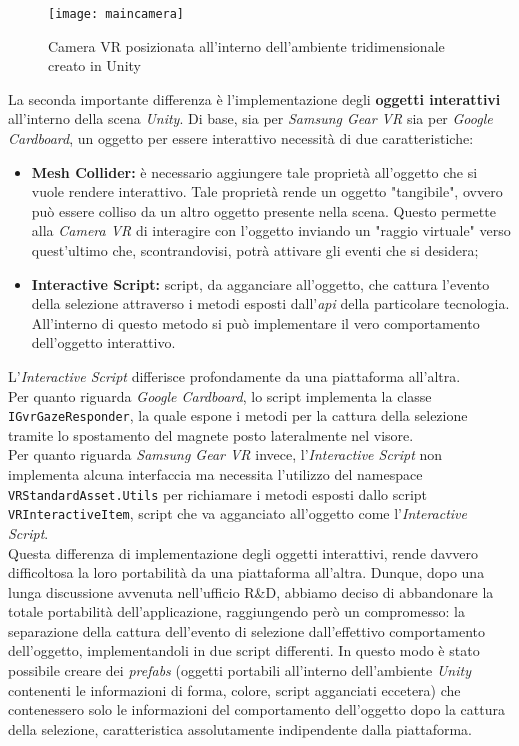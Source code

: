 \label{MainCamera}
\begin{figure}[ht]
	\begin{center}
		\texttt{[image: maincamera]}
		\caption{Camera VR posizionata all'interno dell'ambiente tridimensionale creato in Unity}
	\end{center}
\end{figure}
\FloatBarrier

La seconda importante differenza è l'implementazione degli \textbf{oggetti interattivi} all'interno della scena \textit{Unity}. Di base, sia per \textit{Samsung Gear VR} sia per \textit{Google Cardboard}, un oggetto per essere interattivo necessità di due caratteristiche:

\begin{itemize}
	\item \textbf{Mesh Collider:} è necessario aggiungere tale proprietà all'oggetto che si vuole rendere interattivo. Tale proprietà rende un oggetto "tangibile", ovvero può essere colliso da un altro oggetto presente nella scena. Questo permette alla \textit{Camera VR} di interagire con l'oggetto inviando un "raggio virtuale" verso quest'ultimo che, scontrandovisi, potrà attivare gli eventi che si desidera;
	\item \textbf{Interactive Script:} script, da agganciare all'oggetto, che cattura l'evento della selezione attraverso i metodi esposti dall'\textit{api} della particolare tecnologia. All'interno di questo metodo si può implementare il vero comportamento dell'oggetto interattivo.  
\end{itemize}

L'\textit{Interactive Script} differisce profondamente da una piattaforma all'altra. \\
Per quanto riguarda \textit{Google Cardboard}, lo script implementa la classe \texttt{IGvrGazeResponder}, la quale espone i metodi per la cattura della selezione tramite lo spostamento del magnete posto lateralmente nel visore. \\
Per quanto riguarda \textit{Samsung Gear VR} invece, l'\textit{Interactive Script} non implementa alcuna interfaccia ma necessita l'utilizzo del namespace \texttt{VRStandardAsset.Utils} per richiamare i metodi esposti dallo script \texttt{VRInteractiveItem}, script che va agganciato all'oggetto come l'\textit{Interactive Script}. \\
Questa differenza di implementazione degli oggetti interattivi, rende davvero difficoltosa la loro portabilità da una piattaforma all'altra. Dunque, dopo una lunga discussione avvenuta nell'ufficio R\&D, abbiamo deciso di abbandonare la totale portabilità dell'applicazione, raggiungendo però un compromesso: la separazione della cattura dell'evento di selezione dall'effettivo comportamento dell'oggetto, implementandoli in due script differenti. In questo modo è stato possibile creare dei \textit{prefabs} (oggetti portabili all'interno dell'ambiente \textit{Unity} contenenti le informazioni di forma, colore, script agganciati eccetera) che contenessero solo le informazioni del comportamento dell'oggetto dopo la cattura della selezione, caratteristica assolutamente indipendente dalla piattaforma.    

